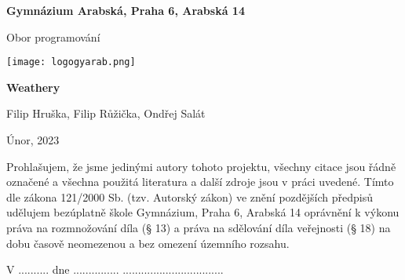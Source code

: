 \begin{titlepage}
\begin{center}
\large \vspace*{\fill}
\thispagestyle{empty}

\LARGE

{ \huge \textbf{Gymnázium Arabská, Praha 6, Arabská 14}}

{\LARGE Obor programování }

\vfill
\texttt{[image: logogyarab.png]}
\vspace{15pt}

\vfill

{\huge \textbf{Weathery}}

\vfill

Filip Hruška, Filip Růžička, Ondřej Salát

\vfill

{\large Únor, 2023}

\vspace*{\fill}
\end{center}
\end{titlepage}

\thispagestyle{empty}
\addtocounter{page}{-1}
\vspace*{\fill}
Prohlašujem, že jsme jedinými autory tohoto projektu, všechny citace jsou řádně označené a všechna
použitá literatura a další zdroje jsou v práci uvedené. Tímto dle zákona 121/2000 Sb. (tzv. Autorský zákon) 
ve znění pozdějších předpisů udělujem bezúplatně škole Gymnázium, Praha 6, Arabská 14 oprávnění k výkonu 
práva na rozmnožování díla (§ 13) a práva na sdělování díla veřejnosti (§ 18) na dobu časově neomezenou a 
bez omezení územního rozsahu.
\bigskip

V .......... dne ............... \hspace{4cm} .................................
\vspace{2cm}

\newpage


\tableofcontents